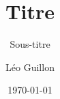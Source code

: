 \documentclass{beamer}
\title{Titre}
\subtitle{Sous-titre}
\author{Léo Guillon}
\date{\today}
\begin{document}
\begin{frame}[plain]
  \titlepage
\end{frame}

\begin{frame}{}
  \tableofcontents
\end{frame}
\end{document}
